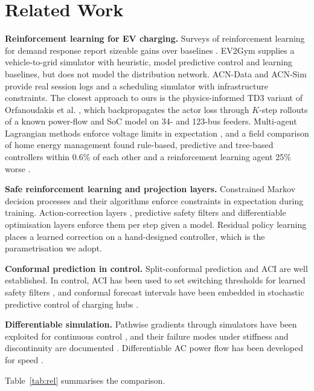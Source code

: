 \documentclass[11pt]{article}
\begin{document}
\section{Related Work}\label{sec:related}
\textbf{Reinforcement learning for EV charging.} Surveys of reinforcement learning for demand response report sizeable gains over baselines \cite{vazquez}. EV2Gym \cite{ev2gym} supplies a vehicle-to-grid simulator with heuristic, model predictive control and learning baselines, but does not model the distribution network. ACN-Data and ACN-Sim \cite{acn,acnsim} provide real session logs and a scheduling simulator with infrastructure constraints. The closest approach to ours is the physics-informed TD3 variant of Orfanoudakis et al. \cite{pitd3}, which backpropagates the actor loss through $K$-step rollouts of a known power-flow and SoC model on 34- and 123-bus feeders. Multi-agent Lagrangian methods enforce voltage limits in expectation \cite{tlmappo}, and a field comparison of home energy management found rule-based, predictive and tree-based controllers within 0.6\% of each other and a reinforcement learning agent 25\% worse \cite{ruddick}.

\textbf{Safe reinforcement learning and projection layers.} Constrained Markov decision processes and their algorithms \cite{garcia,achiam} enforce constraints in expectation during training. Action-correction layers \cite{dalal}, predictive safety filters \cite{wabersich} and differentiable optimisation layers \cite{optnet,cvxpylayers} enforce them per step given a model. Residual policy learning \cite{johannink,silverres} places a learned correction on a hand-designed controller, which is the parametrisation we adopt.

\textbf{Conformal prediction in control.} Split-conformal prediction \cite{vovk,lei,angelopoulos} and ACI \cite{aci} are well established. In control, ACI has been used to set switching thresholds for learned safety filters \cite{acofi}, and conformal forecast intervals have been embedded in stochastic predictive control of charging hubs \cite{zapico}.

\textbf{Differentiable simulation.} Pathwise gradients through simulators have been exploited for continuous control \cite{heess,shac,brax,difftaichi}, and their failure modes under stiffness and discontinuity are documented \cite{suh,metz}. Differentiable AC power flow has been developed for speed \cite{dpf}.

Table~\ref{tab:rel} summarises the comparison.
\end{document}
